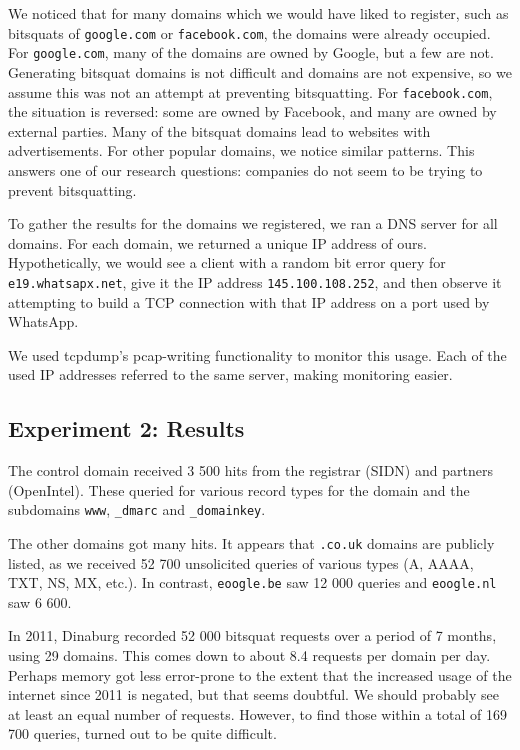 \documentclass[conference]{IEEEtran}
\begin{document}
We noticed that for many domains which we would have liked to register, such as
bitsquats of \texttt{google.com} or \texttt{facebook.com}, the domains were
already occupied. For \texttt{google.com}, many of the domains are owned by
Google, but a few are not. Generating bitsquat domains is not difficult and
domains are not expensive, so we assume this was not an attempt at preventing
bitsquatting. For \texttt{facebook.com}, the situation is reversed: some are
owned by Facebook, and many are owned by external parties. Many of the bitsquat
domains lead to websites with advertisements. For other popular domains, we
notice similar patterns. This answers one of our research questions: companies
do not seem to be trying to prevent bitsquatting.

To gather the results for the domains we registered, we ran a DNS server for
all domains. For each domain, we returned a unique IP address of ours.
Hypothetically, we would see a client with a random bit error query for
\texttt{e19.whatsapx.net}, give it the IP address \texttt{145.100.108.252}, and
then observe it attempting to build a TCP connection with that IP address on a
port used by WhatsApp.

We used tcpdump's pcap-writing functionality to monitor this usage. Each of the
used IP addresses referred to the same server, making monitoring easier.


\subsection{Experiment 2: Results}

The control domain received 3 500 hits from the registrar (SIDN) and partners
(OpenIntel). These queried for various record types for the domain and the
subdomains \texttt{www}, \texttt{\_dmarc} and \texttt{\_domainkey}.

The other domains got many hits. It appears that \texttt{.co.uk} domains are
publicly listed, as we received 52 700 unsolicited queries of various types (A,
AAAA, TXT, NS, MX, etc.). In contrast, \texttt{eoogle.be} saw 12 000 queries
and \texttt{eoogle.nl} saw 6 600.

In 2011, Dinaburg\cite{dinaburg2011bitsquatting} recorded 52 000 bitsquat
requests over a period of 7 months, using 29 domains. This comes down to about
8.4 requests per domain per day. Perhaps memory got less error-prone to the
extent that the increased usage of the internet since 2011 is negated, but that
seems doubtful. We should probably see at least an equal number of requests.
However, to find those within a total of 169 700 queries, turned out to be
quite difficult.
\end{document}
